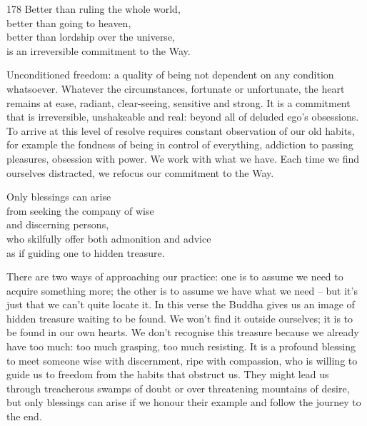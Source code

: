 
\begin{dhpVerse}{178}
\label{dhp-178}
Better than ruling the whole world,\\
better than going to heaven,\\
better than lordship over the universe,\\
is an irreversible commitment to the Way.
\end{dhpVerse}

\begin{dhpRefl}

Unconditioned freedom: a quality of being not dependent on any
condition whatsoever. Whatever the circumstances, fortunate or
unfortunate, the heart remains at ease, radiant, clear-seeing,
sensitive and strong. It is a commitment that is irreversible,
unshakeable and real: beyond all of deluded ego's obsessions. To
arrive at this level of resolve requires constant observation of our
old habits, for example the fondness of being in control of
everything, addiction to passing pleasures, obsession with power. We
work with what we have. Each time we find ourselves distracted, we
refocus our commitment to the Way.

\end{dhpRefl}


\begin{dhpVerse}{76}
\label{dhp-76}
Only blessings can arise\\
from seeking the company of wise\\
and discerning persons,\\
who skilfully offer both admonition and advice\\
as if guiding one to hidden treasure.
\end{dhpVerse}

\begin{dhpRefl}

There are two ways of approaching our practice: one is to assume we need to
acquire something more; the other is to assume we have what we need -- but it's
just that we can't quite locate it. In this verse the Buddha gives us an image
of hidden treasure waiting to be found. We won't find it outside ourselves; it
is to be found in our own hearts. We don't recognise this treasure because we
already have too much: too much grasping, too much resisting. It is a profound
blessing to meet someone wise with discernment, ripe with compassion, who is
willing to guide us to freedom from the habits that obstruct us. They might
lead us through treacherous swamps of doubt or over threatening mountains of
desire, but only blessings can arise if we honour their example and follow the
journey to the end.

\end{dhpRefl}

